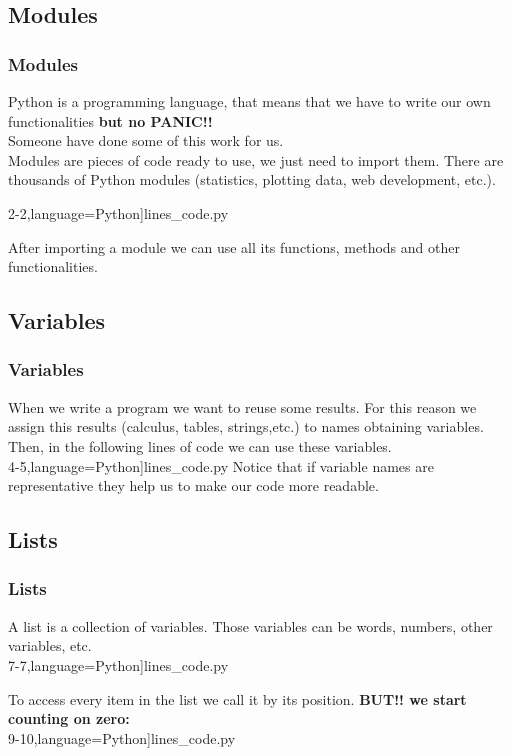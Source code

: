 \subsection{Modules}
\begin{frame}
\frametitle{Modules}

{\normalsize Python is a programming language, that means that we have to write our own functionalities \textbf{but no PANIC!!}\\ Someone have done some of this work for us.\\}
\vspace{1em}
{\normalsize Modules are  pieces of code ready to use, we just need to import them. There are thousands of Python modules (statistics, plotting data, web development, etc.).}

\begin{center}
	{2-2},language=Python]{lines_code.py}
\end{center}

{\normalsize After importing a module we can use all its functions, methods and other functionalities.}

\end{frame}

\subsection{Variables}

\begin{frame}
\frametitle{Variables}
{\normalsize When we write a program we want to reuse some results. For this reason we assign this results (calculus, tables, strings,etc.) to names obtaining variables. \\}
\vspace{1em}
{\normalsize Then, in the following lines of code we can use these variables. \\}
\vspace{1em}
{4-5},language=Python]{lines_code.py}
\vspace{1em}
{\normalsize Notice that if variable names are representative they help us to make our code more readable.}
\end{frame}

\subsection{Lists}
\begin{frame}
\frametitle{Lists}

{\normalsize A list is a collection of variables. Those variables can be words, numbers, other variables, etc. \\}
\vspace{1em}
{7-7},language=Python]{lines_code.py}

\vspace{1em}
{\normalsize To access every item in the list we call it by its position. \textbf{BUT!! we start counting on zero:} \\}
\vspace{1em}
{9-10},language=Python]{lines_code.py}
\end{frame}

